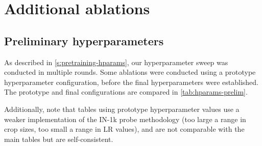 \FloatBarrier
\section{Additional ablations}

\subsection{Preliminary hyperparameters}
\label{s:prelim}

As described in \cref{s:pretraining-hparams}, our hyperparameter sweep was conducted in multiple rounds.
Some ablations were conducted using a prototype hyperparameter configuration, before the final hyperparameters were established.
The prototype and final configurations are compared in \cref{tab:hparams-prelim}.

Additionally, note that tables using prototype hyperparameter values use a weaker implementation of the IN-1k probe methodology (too large a range in crop sizes, too small a range in LR values), and are not comparable with the main tables but are self-consistent.

